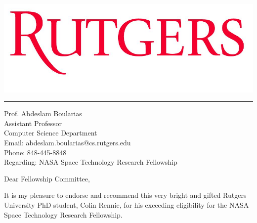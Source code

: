 \documentclass[11pt]{letter} %
\begin{document}
\longindentation=0pt                       %
\let\raggedleft\raggedright                %

\begin{letter}{}

\begin{minipage}[b]{0.3\linewidth}
\includegraphics[scale=0.1]{Rutgers-logo.jpg}
\end{minipage}

\medskip\hrule height 1pt
\begin{flushright}
\hfill Prof. Abdeslam Boularias\\
\hfill Assistant Professor\\
\hfill Computer Science Department \\
\hfill Email: abdeslam.boularias@cs.rutgers.edu \\
\hfill Phone: 848-445-8848\\
\vspace{0.5cm}
\hfill Regarding: NASA Space Technology Research Fellowship
\end{flushright}

\opening{Dear Fellowship Committee,}

\noindent 

It is my pleasure to endorse and recommend this very bright and gifted Rutgers University PhD student, 
Colin Rennie, for his exceeding eligibility for the NASA Space Technology Research Fellowship.


\end{letter}
\end{document}
